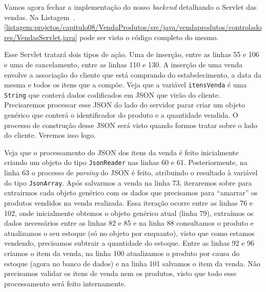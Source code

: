 Vamos agora fechar a implementação do nosso \textit{backend} detalhando o Servlet das vendas. Na Listagem~\thechapter.\ref{listagem:projetos/capitulo08/VendaProdutos/src/java/vendaprodutos/controladores/VendasServlet.java} pode ser visto o código completo do mesmo.


Esse Servlet tratará dois tipos de ação. Uma de inserção, entre as linhas 55 e 106 e uma de cancelamento, entre as linhas 110 e 130. A inserção de uma venda envolve a associação do cliente que está comprando do estabelecimento, a data da mesma e todos os itens que a compõe. Veja que a variável \texttt{itensVenda} é uma \texttt{String} que conterá dados codificados em JSON que virão do cliente. Precisaremos processar esse JSON do lado do servidor parar criar um objeto genérico que conterá o identificador do produto e a quantidade vendida. O processo de construção desse JSON será visto quando formos tratar sobre o lado do cliente. Veremos isso logo.

Veja que o processamento do JSON dos itens da venda é feito inicialmente criando um objeto do tipo \texttt{JsonReader} nas linhas 60 e 61. Posteriormente, na linha 63 o processo de \textit{parsing} do JSON é feito, atribuindo o resultado à variável  do tipo \texttt{JsonArray}. Após salvarmos a venda na linha 73, iteraremos sobre  para extrairmos cada objeto genérico com os dados que precisamos para ``amarrar'' os produtos vendidos na venda realizada. Essa iteração ocorre entre as linhas 76 e 102, onde inicialmente obtemos o objeto genérico atual (linha 79), extraímos os dados necessários entre as linhas 82 e 85 e na linha 88 consultamos o produto e atualizamos o seu estoque (só no objeto por enquanto), visto que como estamos vendendo, precisamos subtrair a quantidade do estoque. Entre as linhas 92 e 96 criamos o item da venda, na linha 100 atualizamos o produto por causa do estoque (agora no banco de dados) e na linha 101 salvamos o item da venda. Não precisamos validar os itens de venda nem os produtos, visto que todo esse processamento será feito internamente.

